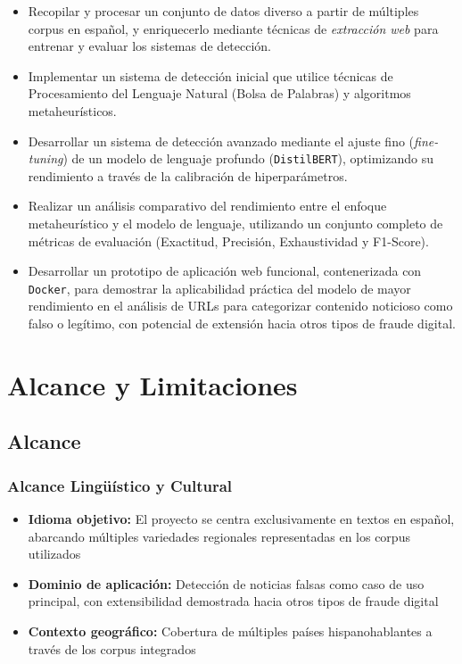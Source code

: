 \begin{itemize}
    \item Recopilar y procesar un conjunto de datos diverso a partir de múltiples corpus en español, y enriquecerlo mediante técnicas de \textit{extracción web} para entrenar y evaluar los sistemas de detección.
    
    \item Implementar un sistema de detección inicial que utilice técnicas de Procesamiento del Lenguaje Natural (Bolsa de Palabras) y algoritmos metaheurísticos.
    
    \item Desarrollar un sistema de detección avanzado mediante el ajuste fino (\textit{fine-tuning}) de un modelo de lenguaje profundo (\texttt{DistilBERT}), optimizando su rendimiento a través de la calibración de hiperparámetros.
    
    \item Realizar un análisis comparativo del rendimiento entre el enfoque metaheurístico y el modelo de lenguaje, utilizando un conjunto completo de métricas de evaluación (Exactitud, Precisión, Exhaustividad y F1-Score).
    
    \item Desarrollar un prototipo de aplicación web funcional, contenerizada con \texttt{Docker}, para demostrar la aplicabilidad práctica del modelo de mayor rendimiento en el análisis de URLs para categorizar contenido noticioso como falso o legítimo, con potencial de extensión hacia otros tipos de fraude digital.
\end{itemize}

\section{Alcance y Limitaciones}

\subsection{Alcance}

\subsubsection{Alcance Lingüístico y Cultural}
\begin{itemize}
    \item \textbf{Idioma objetivo:} El proyecto se centra exclusivamente en textos en español, abarcando múltiples variedades regionales representadas en los corpus utilizados
    \item \textbf{Dominio de aplicación:} Detección de noticias falsas como caso de uso principal, con extensibilidad demostrada hacia otros tipos de fraude digital
    \item \textbf{Contexto geográfico:} Cobertura de múltiples países hispanohablantes a través de los corpus integrados
\end{itemize}

